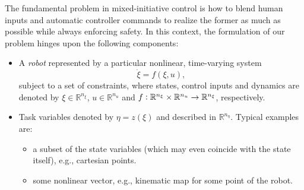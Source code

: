 The fundamental problem in mixed-initiative control is how to blend human inputs and automatic controller commands to realize the former as much as possible while always enforcing safety. In this context, the formulation of our problem hinges upon the following components:
\begin{itemize}
	\item A \emph{robot} represented by a particular nonlinear, time-varying system
\begin{equation}
	\dot{\xi} = f(\xi,u),\label{eq:robot_dynamics}
\end{equation}
subject to a set of constraints, where states, control inputs and dynamics are denoted by $\xi \in \mathbb{R}^{n_\xi}$, $u \in \mathbb{R}^{n_u}$ and $f \vcentcolon \mathbb{R}^{n_\xi} \times \mathbb{R}^{n_u} \rightarrow \mathbb{R}^{n_\xi}$, respectively. 
	\item Task variables denoted by $\eta = z(\xi)$ and described in $\mathbb{R}^{n_\eta}$. Typical examples are:
	\begin{itemize}
	\item a subset of the state variables (which may even coincide with the state itself), e.g., cartesian points.
	\item some nonlinear vector, e.g., kinematic map for some point of the robot.
	\end{itemize}

\end{itemize}
